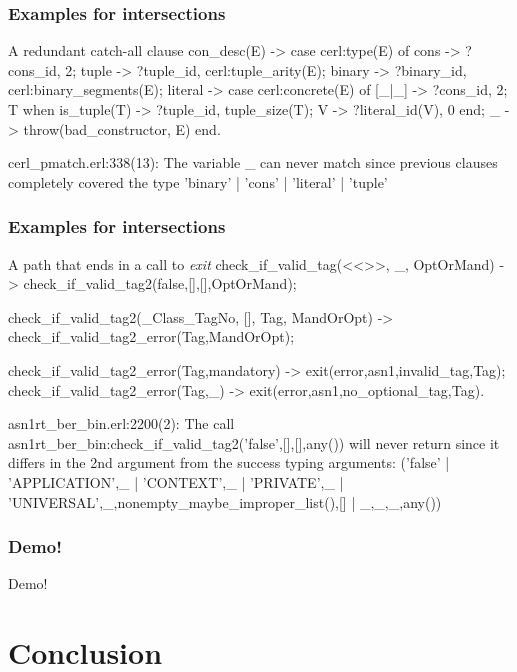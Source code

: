 \documentclass{beamer}
\begin{document}
\begin{frame}[fragile]
  \frametitle{Examples for intersections}
\begin{code}{A redundant catch-all clause}
con_desc(E) ->
  case cerl:type(E) of
    cons -> {?cons_id, 2};
    tuple -> {?tuple_id, cerl:tuple_arity(E)};
    binary -> {?binary_id, cerl:binary_segments(E)};
    literal -> case cerl:concrete(E) of
                 [_|_] -> {?cons_id, 2};
                 T when is_tuple(T) ->
                   {?tuple_id, tuple_size(T)};
                 V -> {?literal_id(V), 0}
               end;
    _ ->
      throw({bad_constructor, E})
  end.

cerl_pmatch.erl:338(13): The variable _ can never match
since previous clauses completely covered the type
'binary' | 'cons' | 'literal' | 'tuple'
\end{code}

\end{frame}

\begin{frame}[fragile]
  \frametitle{Examples for intersections}
\begin{code}{A path that ends in a call to \emph{exit}}
check_if_valid_tag(<<>>, _, OptOrMand) ->
    check_if_valid_tag2(false,[],[],OptOrMand);

check_if_valid_tag2(_Class_TagNo, [], Tag, MandOrOpt) ->
    check_if_valid_tag2_error(Tag,MandOrOpt);

check_if_valid_tag2_error(Tag,mandatory) ->
    exit({error,{asn1,{invalid_tag,Tag}}});
check_if_valid_tag2_error(Tag,_) ->
    exit({error,{asn1,{no_optional_tag,Tag}}}).

asn1rt_ber_bin.erl:2200(2): The call
 asn1rt_ber_bin:check_if_valid_tag2('false',[],[],any())
 will never return since it differs in the 2nd argument
 from the success typing arguments: ('false' |
 {'APPLICATION',_} | {'CONTEXT',_} | {'PRIVATE',_} |
 {'UNIVERSAL',_},nonempty_maybe_improper_list(),[] |
 {_,_,_},any())
\end{code}
\end{frame}

\begin{frame}
  \frametitle{Demo!}
  \begin{center}
    Demo!
  \end{center}
\end{frame}

\section{Conclusion}
\end{document}

